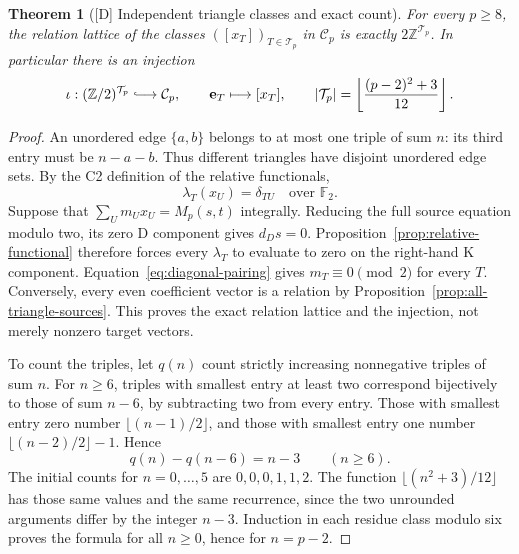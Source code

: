 \documentclass[11pt]{article}
\newtheorem{theorem}{Theorem}[section]
\theoremstyle{definition}
\theoremstyle{remark}
\newcommand{\Z}{\mathbb Z}
\begin{document}
\begin{theorem}[{[D]} Independent triangle classes and exact count]\label{thm:quadratic}
For every $p\geq8$, the relation lattice of the classes
$([x_T])_{T\in\mathcal T_p}$ in $\mathcal C_p$ is exactly
$2\Z^{\mathcal T_p}$. In particular there is an injection
\begin{equation}\label{eq:family-injection}
 \iota:(\Z/2)^{\mathcal T_p}\lhook\joinrel\longrightarrow\mathcal C_p,
 \qquad \mathbf e_T\longmapsto[x_T],
 \qquad |\mathcal T_p|=\left\lfloor\frac{(p-2)^2+3}{12}\right\rfloor.
\end{equation}
\end{theorem}
\begin{proof}
An unordered edge $\{a,b\}$ belongs to at most one triple of sum $n$:
its third entry must be $n-a-b$. Thus different triangles have disjoint
unordered edge sets. By the C2 definition of the relative functionals,
\begin{equation}\label{eq:diagonal-pairing}
 \lambda_T(x_U)=\delta_{TU}\quad\text{over }\mathbb F_2.
\end{equation}
Suppose that $\sum_U m_Ux_U=M_p(s,t)$ integrally. Reducing the full
source equation modulo two, its zero D component gives $d_Ds=0$.
Proposition~\ref{prop:relative-functional} therefore forces every
$\lambda_T$ to evaluate to zero on the right-hand K component.
Equation~\eqref{eq:diagonal-pairing} gives $m_T\equiv0\pmod2$ for
every $T$. Conversely, every even coefficient vector is a relation by
Proposition~\ref{prop:all-triangle-sources}. This proves the exact
relation lattice and the injection, not merely nonzero target vectors.

To count the triples, let $q(n)$ count strictly increasing nonnegative
triples of sum $n$. For $n\geq6$, triples with smallest entry at least
two correspond bijectively to those of sum $n-6$, by subtracting two
from every entry. Those with smallest entry zero number
$\lfloor(n-1)/2\rfloor$, and those with smallest entry one number
$\lfloor(n-2)/2\rfloor-1$. Hence
\begin{equation}\label{eq:count-recurrence}
 q(n)-q(n-6)=n-3\qquad(n\geq6).
\end{equation}
The initial counts for $n=0,\ldots,5$ are $0,0,0,1,1,2$.
The function $\lfloor(n^2+3)/12\rfloor$ has those same values and
the same recurrence, since the two unrounded arguments differ by the
integer $n-3$. Induction in each residue class modulo six proves the
formula for all $n\geq0$, hence for $n=p-2$.
\end{proof}
\end{document}
